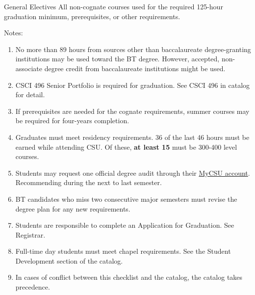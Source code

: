 \begin{reqgroup}{General Electives}
All non-cognate courses used for the required 125-hour graduation minimum, prerequisites, or other requirements.
\end{reqgroup}

Notes:%
\begin{enumerate}\footnotesize
	\item No more than 89 hours from sources other than baccalaureate degree-granting institutions may be used toward the BT degree. However, accepted, non-associate degree credit from baccalaureate institutions might be used.
	\item CSCI 496 Senior Portfolio is required for graduation. See CSCI 496 in catalog for detail.
	\item If prerequisites are needed for the cognate requirements, summer courses may be required for four-years completion.
	\item Graduates must meet residency requirements. 36 of the last 46 hours must be earned while attending CSU. Of these, \textbf{at least 15} must be 300-400 level courses.
	\item Students may request one official degree audit through their \href{https://portal.csuniv.edu/}{MyCSU account}. Recommending during the next to last semester.
	\item BT candidates who miss two consecutive major semesters must revise the degree plan for any new requirements.
	\item Students are responsible to complete an Application for Graduation. See Registrar.
	\item Full-time day students must meet chapel requirements. See the Student Development section of the catalog.
	\item In cases of conflict between this checklist and the catalog, the catalog takes precedence.
\end{enumerate}